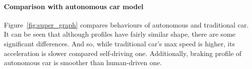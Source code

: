 \documentclass[11pt,english]{article}
\begin{document}

















\paragraph{Comparison with autonomous car model}


Figure~\ref{fig:super_graph} compares behaviours of autonomous and traditional car. It can be seen that although profiles have fairly similar shape, there are some significant differences. And so, while traditional car's max speed is higher, its acceleration is slower compared self-driving one. Additionally, braking profile of autonomous car is smoother than human-driven one.

\end{document}
